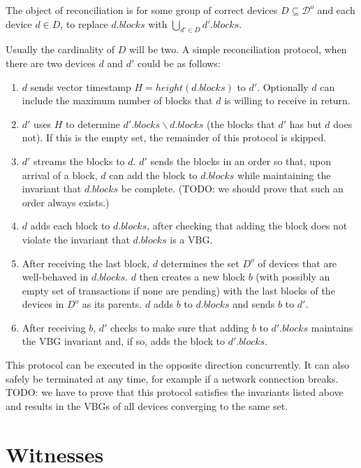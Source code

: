 \documentclass{article}
\begin{document}
The object of reconciliation is for some group of correct devices $D \subseteq \mathcal{D}^o$
and each device $d \in D$, 
to replace $d.\mathit{blocks}$ with $\bigcup_{d' \in D} d'.\mathit{blocks}$.

Usually the cardinality of $D$ will be two.  A simple reconciliation protocol,
when there are two devices $d$ and $d'$ could be as follows:

\begin{enumerate}
\item $d$ sends vector timestamp $H = \mathit{height}(d.\mathit{blocks})$ to $d'$.  Optionally $d$ can include the maximum number of blocks that $d$ is willing to receive in return.
\item $d'$ uses $H$ to determine $d'.\mathit{blocks} \backslash d.\mathit{blocks}$ (the blocks that $d'$ has but $d$ does not).  If this is the empty set, the remainder of this protocol is skipped.
\item $d'$ streams the blocks to $d$.  $d'$ sends the blocks in an order so that, upon arrival of a block, $d$ can add the block to $d.\mathit{blocks}$ while maintaining the invariant that $d.\mathit{blocks}$ be complete.  (TODO: we should prove that such an order always exists.)
\item $d$ adds each block to $d.\mathit{blocks}$, after checking that adding the block does not violate
the invariant that $d.\mathit{blocks}$ is a VBG.
\item After receiving the last block, $d$ determines the set $D^o$ of devices that are well-behaved in $d.\mathit{blocks}$.  $d$ then creates a new block $b$ (with possibly an empty set of transactions if none are pending) with the last blocks of the devices in $D^o$ as its parents.  $d$ adds $b$ to $d.\mathit{blocks}$ and sends $b$ to $d'$.
\item After receiving $b$, $d'$ checks to make sure that adding $b$ to $d'.\mathit{blocks}$ maintains the VBG invariant and, if so, adds the block to $d'.\mathit{blocks}$.
\end{enumerate}

This protocol can be executed in the opposite direction concurrently.
It can also safely be terminated at any time, for example if a network connection breaks.
TODO: we have to prove that this protocol satisfies the invariants listed above and results in
the VBGs of all devices converging to the same set.

\section*{Witnesses}
\end{document}
